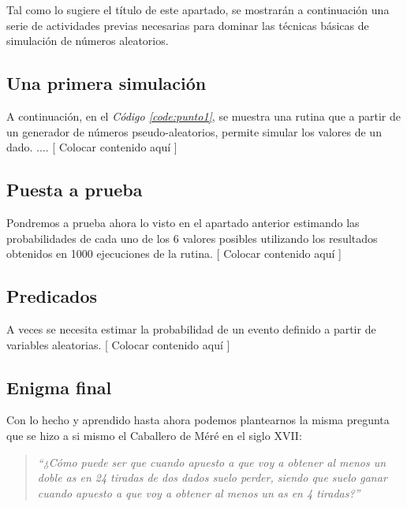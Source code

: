 \documentclass{article}
\newcommand{\refcode}[1]{\textit{Código \ref{#1}}}
\begin{document}
Tal como lo sugiere el título de este apartado, se mostrarán a continuación una serie de actividades previas necesarias para dominar las técnicas básicas de simulación de números aleatorios.


\subsection{Una primera simulación}

A continuación, en el \refcode{code:punto1}, se muestra una rutina que a partir de un generador de números pseudo-aleatorios, permite simular los valores de un dado. .... [ Colocar contenido aquí ]



\subsection{Puesta a prueba}

Pondremos a prueba ahora lo visto en el apartado anterior estimando las probabilidades de cada uno de los 6 valores posibles utilizando los resultados obtenidos en 1000 ejecuciones de la rutina. [ Colocar contenido aquí ]


\subsection{Predicados}

A veces se necesita estimar la probabilidad de un evento definido a partir de variables aleatorias. [ Colocar contenido aquí ]



\subsection{Enigma final}

Con lo hecho y aprendido hasta ahora podemos plantearnos la misma pregunta que se hizo a si mismo el Caballero de Méré en el siglo XVII: 

\begin{quotation}
\em``¿Cómo puede ser que cuando apuesto a que voy a obtener al menos un doble as en 24 tiradas de dos dados suelo perder, siendo que suelo ganar cuando apuesto a que voy a obtener al menos un as en 4 tiradas?''
\end{quotation}
\end{document}
